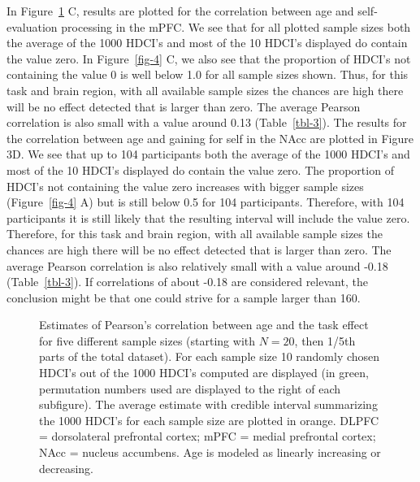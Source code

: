\documentclass[
  letterpaper,
  DIV=11,
  numbers=noendperiod]{scrartcl}
\begin{document}
In Figure~\ref{fig-3} C, results are plotted for the correlation between
age and self-evaluation processing in the mPFC. We see that for all
plotted sample sizes both the average of the 1000 HDCI's and most of the
10 HDCI's displayed do contain the value zero. In Figure~\ref{fig-4} C,
we also see that the proportion of HDCI's not containing the value 0 is
well below 1.0 for all sample sizes shown. Thus, for this task and brain
region, with all available sample sizes the chances are high there will
be no effect detected that is larger than zero. The average Pearson
correlation is also small with a value around 0.13 (Table~\ref{tbl-3}).
The results for the correlation between age and gaining for self in the
NAcc are plotted in Figure 3D. We see that up to 104 participants both
the average of the 1000 HDCI's and most of the 10 HDCI's displayed do
contain the value zero. The proportion of HDCI's not containing the
value zero increases with bigger sample sizes (Figure~\ref{fig-4} A) but
is still below 0.5 for 104 participants. Therefore, with 104
participants it is still likely that the resulting interval will include
the value zero. Therefore, for this task and brain region, with all
available sample sizes the chances are high there will be no effect
detected that is larger than zero. The average Pearson correlation is
also relatively small with a value around -0.18 (Table~\ref{tbl-3}). If
correlations of about -0.18 are considered relevant, the conclusion
might be that one could strive for a sample larger than 160.

\begin{figure}


\caption{\label{fig-3}Estimates of Pearson's correlation between age and
the task effect for five different sample sizes (starting with \(N=20\),
then 1/5th parts of the total dataset). For each sample size 10 randomly
chosen HDCI's out of the 1000 HDCI's computed are displayed (in green,
permutation numbers used are displayed to the right of each subfigure).
The average estimate with credible interval summarizing the 1000 HDCI's
for each sample size are plotted in orange. DLPFC = dorsolateral
prefrontal cortex; mPFC = medial prefrontal cortex; NAcc = nucleus
accumbens. Age is modeled as linearly increasing or decreasing.}

\end{figure}%
\end{document}
